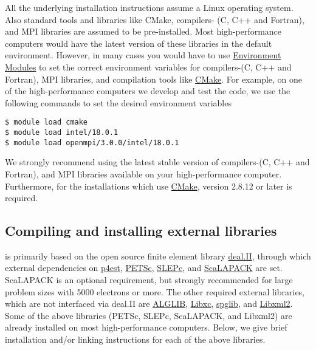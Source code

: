 All the underlying installation instructions assume a Linux operating system. Also standard tools and libraries like CMake, compilers- (C, C++ and Fortran), and MPI libraries are assumed to be pre-installed. Most high-performance computers would have the latest version of these libraries in the default environment. However, in many cases you would have to use \href{http://modules.sourceforge.net/}{Environment Modules} to set the correct environment variables for compilers-(C, C++ and Fortran), MPI libraries, and compilation tools like \href{http://www.cmake.org/}{CMake}. For example, on one of the high-performance computers we develop and test the \dftfe{} code, we use the following commands to set the desired environment variables
\begin{verbatim}
$ module load cmake
$ module load intel/18.0.1
$ module load openmpi/3.0.0/intel/18.0.1
\end{verbatim}
We strongly recommend using the latest stable version of compilers-(C, C++ and Fortran), and MPI libraries available on your high-performance computer. Furthermore, for the installations which use \href{http://www.cmake.org/}{CMake}, version 2.8.12 or later is required.   

\subsection{Compiling and installing external libraries}
\dftfe{} is primarily based on the open source finite element library \href{http://www.dealii.org/}{deal.II}, through which external dependencies
on \href{http://p4est.org/}{p4est}, \href{https://www.mcs.anl.gov/petsc/}{PETSc}, \href{http://slepc.upv.es/}{SLEPc}, and \href{http://www.netlib.org/scalapack/}{ScaLAPACK} are set. ScaLAPACK is an optional requirement, but strongly recommended for large problem sizes with 5000 electrons or more. The other required external libraries, which are
not interfaced via deal.II are \href{http://www.alglib.net/}{ALGLIB}, \href{http://www.tddft.org/programs/libxc/}{Libxc}, \href{https://atztogo.github.io/spglib/}{spglib}, and \href{http://www.xmlsoft.org/}{Libxml2}. Some of the above libraries (PETSc, SLEPc, ScaLAPACK, and Libxml2) are already installed on most high-performance computers. Below, we give brief installation and/or linking instructions for each of the above libraries.

